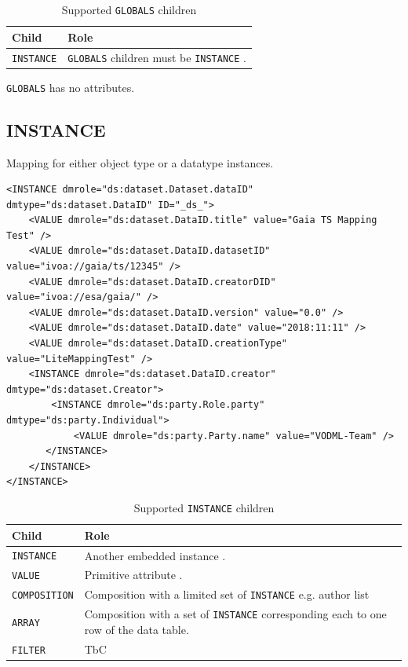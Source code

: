 \documentclass[11pt,a4paper]{ivoa}
\begin{document}
\begin{table}[ht!]
     \begin{tabular}{|p{3cm}|p{7cm}|}
       \hline Child &  Role\\
       \hline  \texttt{INSTANCE}    &  \texttt{GLOBALS} children must be \texttt{INSTANCE} . \\       
       \hline 
     \end{tabular}
     \caption{Supported  \texttt{GLOBALS} children} 
 \end{table}

 \texttt{GLOBALS} has no attributes. 


\subsection{INSTANCE}

Mapping for either object type or a datatype instances.


\begin{lstlisting}[caption={INSTANCE bloc example},captionpos=b]
<INSTANCE dmrole="ds:dataset.Dataset.dataID" dmtype="ds:dataset.DataID" ID="_ds_">
    <VALUE dmrole="ds:dataset.DataID.title" value="Gaia TS Mapping Test" />
    <VALUE dmrole="ds:dataset.DataID.datasetID" value="ivoa://gaia/ts/12345" />
    <VALUE dmrole="ds:dataset.DataID.creatorDID" value="ivoa://esa/gaia/" />
    <VALUE dmrole="ds:dataset.DataID.version" value="0.0" />
    <VALUE dmrole="ds:dataset.DataID.date" value="2018:11:11" />
    <VALUE dmrole="ds:dataset.DataID.creationType" value="LiteMappingTest" />
    <INSTANCE dmrole="ds:dataset.DataID.creator" dmtype="ds:dataset.Creator">
        <INSTANCE dmrole="ds:party.Role.party" dmtype="ds:party.Individual">
            <VALUE dmrole="ds:party.Party.name" value="VODML-Team" />
       </INSTANCE>
    </INSTANCE>
</INSTANCE>
\end{lstlisting}




\begin{table}[ht!]
     \begin{tabular}{|p{3cm}|p{7cm}|}
       \hline Child &  Role\\
       \hline  \texttt{INSTANCE}    & Another embedded instance . \\       
       \hline  \texttt{VALUE}    & Primitive attribute . \\       
       \hline  \texttt{COMPOSITION}    & Composition with a limited set of  \texttt{INSTANCE} e.g. author list\\      
       \hline  \texttt{ARRAY}    & Composition with a set of  \texttt{INSTANCE} corresponding each to one row of the data table. \\
       \hline  \texttt{FILTER}    & TbC \\
       \hline 
     \end{tabular}
     \caption{Supported  \texttt{INSTANCE} children} 
 \end{table}
\end{document}
